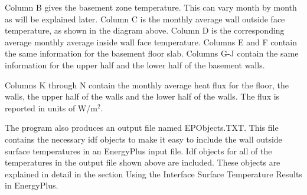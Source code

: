 Column B gives the basement zone temperature. This can vary month by month as will be explained later. Column C is the monthly average wall outside face temperature, as shown in the diagram above. Column D is the corresponding average monthly average inside wall face temperature. Columns E and F contain the same information for the basement floor slab. Columns G-J contain the same information for the upper half and the lower half of the basement walls.

Columns K through N contain the monthly average heat flux for the floor, the walls, the upper half of the walls and the lower half of the walls. The flux is reported in units of W/m\(^{2}\).

The program also produces an output file named EPObjects.TXT. This file contains the necessary idf objects to make it easy to include the wall outside surface temperatures in an EnergyPlus input file. Idf objects for all of the temperatures in the output file shown above are included. These objects are explained in detail in the section Using the Interface Surface Temperature Results in EnergyPlus.
